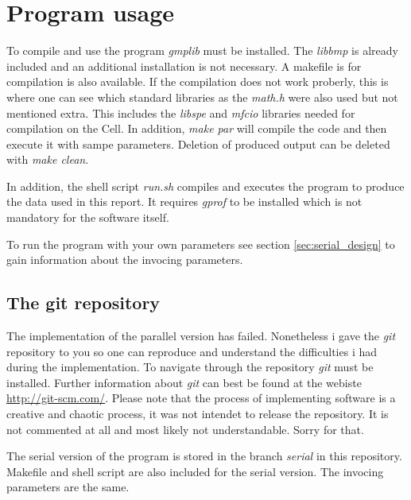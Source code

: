 \section{Program usage}
\label{sec:usage}

To compile and use the program \emph{gmplib} must be installed. The \emph{libbmp} is already included and an additional installation is not necessary. A makefile is for compilation is also available. If the compilation does not work proberly, this is where one can see which standard libraries as the \emph{math.h} were also used but not mentioned extra. This includes the \emph{libspe} and \emph{mfcio} libraries needed for compilation on the Cell. In addition, \emph{make par} will compile the code and then execute it with sampe parameters. Deletion of produced output can be deleted with \emph{make clean}.

In addition, the shell script \emph{run.sh} compiles and executes the program to produce the data used in this report. It requires \emph{gprof} to be installed which is not mandatory for the software itself.

To run the program with your own parameters see section \ref{sec:serial_design} to gain information about the invocing parameters.

\subsection{The git repository}
The implementation of the parallel version has failed. Nonetheless i gave the \emph{git} repository to you so one can reproduce and understand the difficulties i had during the implementation. To navigate through the repository \emph{git} must be installed. Further information about \emph{git} can best be found at the webiste \url{http://git-scm.com/}.
Please note that the process of implementing software is a creative and chaotic process, it was not intendet to release the repository. It is not commented at all and most likely not understandable. Sorry for that.

The serial version of the program is stored in the branch \emph{serial} in this repository. Makefile and shell script are also included for the serial version. The invocing parameters are the same. 


